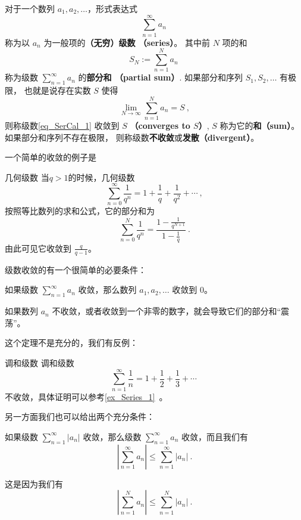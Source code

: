 
\begin{issues}
\issueDraft
\end{issues}


对于一个数列 $a_1,a_2,\dots$，形式表达式
\begin{equation}\label{eq_SerCal_1}
\sum_{n=1}^\infty a_n~
\end{equation}
称为以 $a_n$ 为一般项的\textbf{（无穷）级数 （series）}。 其中前 $N$ 项的和
\begin{equation}
S_N:=\sum_{n=1}^N a_n~
\end{equation}
称为级数 $\sum_{n=1}^\infty a_n$ 的\textbf{部分和 （partial sum）}. 如果部分和序列 $S_1,S_2,\dots$ 有极限， 也就是说存在实数 $S$ 使得
\begin{equation}
\lim_{N\to\infty}\sum_{n=1}^N a_n=S~,
\end{equation}
则称级数\autoref{eq_SerCal_1} 收敛到 $S$ \textbf{（converges to $S$）}, $S$ 称为它的\textbf{和（sum）}。 如果部分和序列不存在极限， 则称级数\textbf{不收敛}或\textbf{发散（divergent）}。

一个简单的收敛的例子是
\begin{example}{几何级数}
当$q > 1$的时候，几何级数
$$
\sum_{n=0}^\infty \frac1{q^n} = 1 + \frac1{q} + \frac1{q^2} + \cdots~,
$$
按照等比数列的求和公式，它的部分和为
$$
\sum_{n=0}^N \frac1{q^n} =\frac{1 - \frac1{q^{N+1}}}{1 - \frac1{q}}~.
$$
由此可见它收敛到 $\frac{q}{q - 1}$。
\end{example}

级数收敛的有一个很简单的必要条件：
\begin{theorem}{}
如果级数 $\sum_{n=1}^\infty a_n$ 收敛，那么数列 $a_1, a_2, \dots$ 收敛到 $0$。
\end{theorem}
如果数列 $a_n$ 不收敛，或者收敛到一个非零的数字，就会导致它们的部分和“震荡”。

这个定理不是充分的，我们有反例：
\begin{example}{调和级数}
调和级数
$$
\sum_{n=1}^\infty\frac{1}{n} = 1 + \frac12 + \frac13 + \cdots~
$$
不收敛，具体证明可以参考\autoref{ex_Series_1}~。
\end{example}

另一方面我们也可以给出两个充分条件：
\begin{theorem}{}
如果级数 $\sum_{n=1}^\infty |a_n|$ 收敛，那么级数 $\sum_{n=1}^\infty a_n$ 收敛，而且我们有
$$
\left| \sum_{n=1}^\infty a_n \right| \leq \sum_{n=1}^\infty |a_n| ~.
$$
\end{theorem}
这是因为我们有
$$
\left|\sum_{n=1}^N a_n\right| \leq \sum_{n=1}^N |a_n|~.
$$

